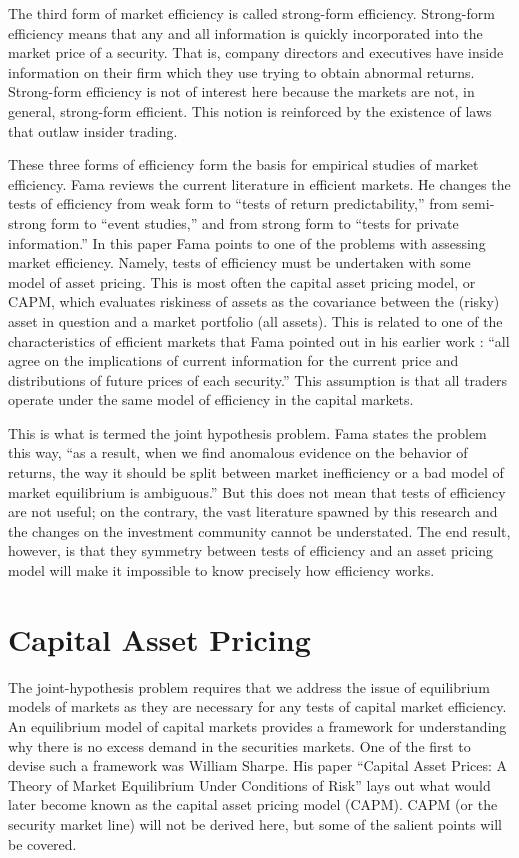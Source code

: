 The third form of market efficiency is called strong-form efficiency. Strong-form efficiency means that any and all information is quickly incorporated into the market price of a security. That is, company directors and executives have inside information on their firm which they use trying to obtain abnormal returns. Strong-form efficiency is not of interest here because the markets are not, in general, strong-form efficient. This notion is reinforced by the existence of laws that outlaw insider trading.

These three forms of efficiency form the basis for empirical studies of market efficiency. Fama \cite{fama91} reviews the current literature in efficient markets. He changes the tests of efficiency from weak form to ``tests of return predictability,'' from semi-strong form to ``event studies,'' and from strong form to ``tests for private information.'' In this paper Fama points to one of the problems with assessing market efficiency. Namely, tests of efficiency must be undertaken with some model of asset pricing. This is most often the capital asset pricing model, or CAPM, which evaluates riskiness of assets as the covariance between the (risky) asset in question and a market portfolio (all assets). This is related to one of the characteristics of efficient markets that Fama pointed out in his earlier work \cite{fama70}: ``all agree on the implications of current information for the current price and distributions of future prices of each security.'' This assumption is that all traders operate under the same model of efficiency in the capital markets.

This is what is termed the joint hypothesis problem. Fama states the problem this way, ``as a result, when we find anomalous evidence on the behavior of returns, the way it should be split between market inefficiency or a bad model of market equilibrium is ambiguous.'' \cite{fama91} But this does not mean that tests of efficiency are not useful; on the contrary, the vast literature spawned by this research and the changes on the investment community cannot be understated. The end result, however, is that they symmetry between tests of efficiency and an asset pricing model will make it impossible to know precisely how efficiency works.

\section{Capital Asset Pricing}

The joint-hypothesis problem requires that we address the issue of equilibrium models of markets as they are necessary for any tests of capital market efficiency. An equilibrium model of capital markets provides a framework for understanding why there is no excess demand in the securities markets. One of the first to devise such a framework was William Sharpe. His paper ``Capital Asset Prices: A Theory of Market Equilibrium Under Conditions of Risk'' \cite{sharpe64} lays out what would later become known as the capital asset pricing model (CAPM). CAPM (or the security market line) will not be derived here, but some of the salient points will be covered.

